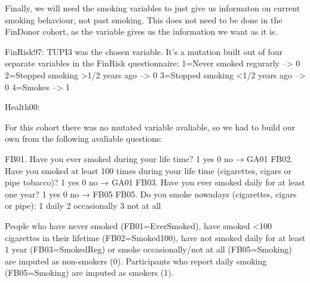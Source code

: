 \documentclass[
]{article}
\begin{document}
Finally, we will need the smoking variables to just give us informaton
on current smoking behaviour, not past smoking. This does not need to be
done in the FinDonor cohort, as the variable gives us the information we
want as it is.

FinRisk97: TUPI3 was the chosen variable. It's a mutation built out of
four separate variables in the FinRisk questionnaire: 1=Never smoked
regurarly --\textgreater{} 0 2=Stopped smoking \textgreater1/2 years ago
--\textgreater{} 0 3=Stopped smoking \textless1/2 years ago
--\textgreater{} 0 4=Smokes --\textgreater{} 1

Health00:

For this cohort there was no mutated variable avaliable, so we had to
build our own from the following avaliable questions:

FB01. Have you ever smoked during your life time? 1 yes 0 no → GA01
FB02. Have you smoked at least 100 times during your life time
(cigarettes, cigars or pipe tobacco)? 1 yes 0 no → GA01 FB03. Have you
ever smoked daily for at least one year? 1 yes 0 no → FB05 FB05. Do you
smoke nowadays (cigarettes, cigars or pipe): 1 daily 2 occasionally 3
not at all

People who have never smoked (FB01=EverSmoked), have smoked \textless100
cigarettes in their lifetime (FB02=Smoked100), have not smoked daily for
at least 1 year (FB03=SmokedReg) or smoke occasionally/not at all
(FB05=Smoking) are imputed as non-smokers (0). Participants who report
daily smoking (FB05=Smoking) are imputed as smokers (1).
\end{document}
